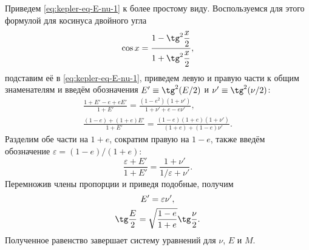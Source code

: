 \newcommand{\sqTgHalf}[1]{#1'}

Приведем \eqref{eq:kepler-eq-E-nu-1} к более простому виду. Воспользуемся для этого формулой для косинуса двойного угла
\begin{equation*}
     \cos x = \frac{\raisebox{5pt}{$1 - \tg^2 \dfrac{x}{2}$}}{\raisebox{-5pt}{$1 + \tg^2 \dfrac{x}{2}$}},
\end{equation*}
подставим её в \eqref{eq:kepler-eq-E-nu-1}, приведем левую и правую части к общим знаменателям и введём обозначения $\sqTgHalf{E} \equiv \tg^2 (E/2)$ и $\sqTgHalf{\nu} \equiv \tg^2 (\nu/2)$:
\begin{gather*}
    \frac{1 + \sqTgHalf{E} - e + e \sqTgHalf{E}}{1 + \sqTgHalf{E}} = \frac{(1 - e^2) \left( 1 + \sqTgHalf{\nu} \right)}{1 + \sqTgHalf{\nu} + e - e \sqTgHalf{\nu}},\\
    \frac{(1 - e) + (1 + e) \sqTgHalf{E}}{1 + \sqTgHalf{E}} = \frac{(1-e)(1+e)\left( 1 + \sqTgHalf{\nu} \right)}{(1 + e) + (1 - e) \sqTgHalf{\nu} }.
\end{gather*}
Разделим обе части на $1 + e$, сократим правую на $1 - e$, также введём обозначение $\varepsilon = (1 - e) / (1 + e)$:
\begin{equation*}
    \frac{\varepsilon + \sqTgHalf{E}}{1 + \sqTgHalf{E}} = \frac{1 + \sqTgHalf{\nu}}{1 / \varepsilon + \sqTgHalf{\nu}}.
\end{equation*}
Перемножив члены пропорции и приведя подобные, получим
\begin{gather}
    \sqTgHalf{E} = \varepsilon \sqTgHalf{\nu},\nonumber\\
    \tg \frac{E}{2} = \sqrt{\frac{1 - e}{1 + e}} \tg \frac{\nu}{2}.
    \label{eq:kepler-eq-E-nu-2}
\end{gather}
Полученное равенство завершает систему уравнений для $\nu$, $E$ и $M$.
